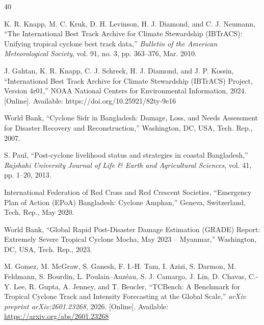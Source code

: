 \documentclass[10pt,twocolumn,a4paper]{article}
\begin{document}
\footnotesize
\setlength{\itemsep}{0pt plus 0.3pt}
\begin{thebibliography}{40}
\setlength{\itemsep}{0pt plus 0.3pt}

K. R. Knapp, M. C. Kruk, D. H. Levinson, H. J. Diamond, and C. J. Neumann, ``The International Best Track Archive for Climate Stewardship (IBTrACS): Unifying tropical cyclone best track data,'' \textit{Bulletin of the American Meteorological Society}, vol. 91, no. 3, pp. 363--376, Mar. 2010.

J. Gahtan, K. R. Knapp, C. J. Schreck, H. J. Diamond, and J. P. Kossin, ``International Best Track Archive for Climate Stewardship (IBTrACS) Project, Version 4r01,'' NOAA National Centers for Environmental Information, 2024. [Online]. Available: https://doi.org/10.25921/82ty-9e16

World Bank, ``Cyclone Sidr in Bangladesh: Damage, Loss, and Needs Assessment for Disaster Recovery and Reconstruction,'' Washington, DC, USA, Tech. Rep., 2007.

S. Paul, ``Post-cyclone livelihood status and strategies in coastal Bangladesh,'' \textit{Rajshahi University Journal of Life \& Earth and Agricultural Sciences}, vol. 41, pp. 1--20, 2013.

International Federation of Red Cross and Red Crescent Societies, ``Emergency Plan of Action (EPoA) Bangladesh: Cyclone Amphan,'' Geneva, Switzerland, Tech. Rep., May 2020.

World Bank, ``Global Rapid Post-Disaster Damage Estimation (GRADE) Report: Extremely Severe Tropical Cyclone Mocha, May 2023 -- Myanmar,'' Washington, DC, USA, Tech. Rep., 2023.


M. Gomez, M. McGraw, S. Ganesh, F. I.-H. Tam, I. Azizi, S. Darmon, M. Feldmann, S. Bourdin, L. Poulain--Auz\'{e}au, S. J. Camargo, J. Lin, D. Chavas, C.-Y. Lee, R. Gupta, A. Jenney, and T. Beucler, ``TCBench: A Benchmark for Tropical Cyclone Track and Intensity Forecasting at the Global Scale,'' \textit{arXiv preprint arXiv:2601.23268}, 2026. [Online]. Available: \url{https://arxiv.org/abs/2601.23268}


\end{thebibliography}
\end{document}
